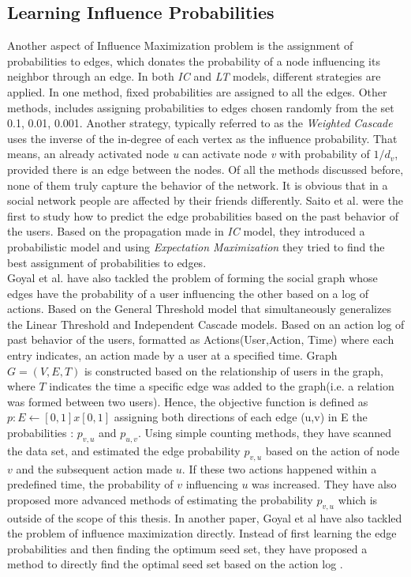 \documentclass[english]{tktltiki}
\begin{document}
\subsection{Learning Influence Probabilities}
\label{subsec:learninginfprob}
Another aspect of Influence Maximization problem is the assignment of probabilities to edges, which donates the probability of a node influencing its neighbor through an edge. In both \textit{IC} and \textit{LT} models, different strategies are applied. In one method, fixed probabilities are assigned to all the edges. Other methods, includes assigning probabilities to edges chosen randomly from the set {0.1, 0.01, 0.001}. Another strategy, typically referred to as the \textit{Weighted Cascade} uses the inverse of the in-degree of each vertex as the influence probability. That means, an already activated node \textit{u} can activate node \textit{v} with probability of $1/d_v$, provided there is an edge between the nodes. Of all the methods discussed before, none of them truly capture the behavior of the network. It is obvious that in a social network people are affected by their friends differently. Saito et al. \cite{saito08} were the first to study how to predict the edge probabilities based on the past behavior of the users. Based on the propagation made in \textit{IC} model, they introduced a probabilistic model and using \textit{Expectation Maximization} they tried to find the best assignment of probabilities to edges. \\
Goyal et al. \cite{goyal10} have also tackled the problem of forming the social graph whose edges have the probability of a user
influencing the other based on a log of actions. Based on the General Threshold model that simultaneously 
generalizes the Linear Threshold and Independent Cascade models. Based on an action log of past behavior of the users, formatted as Actions(User,Action, Time) where each entry indicates, an action made by a user at a specified time. 
Graph $G = (V,E,T)$ is constructed based on the relationship of users in the graph, where $T$ indicates the time a specific edge was added to the graph(i.e. a relation was formed between two users). Hence, the objective function is defined as $p : E \leftarrow [0,1] x [0,1]$ assigning both directions of each edge (u,v) in E the probabilities : $p_{v,u}$ and $p_{u,v}$.
Using simple counting methods, they have scanned the data set, and estimated the edge probability $p_{v,u}$ based on the action of node $v$ and the subsequent action made $u$. If these two actions happened within a predefined time, the probability of $v$ influencing $u$ was increased. They have also proposed more advanced methods of estimating the probability $p_{v,u}$ which is outside of the scope of this thesis.
In another paper, Goyal et al \cite{goyal11} have also tackled the problem of influence maximization directly. Instead of first learning the edge probabilities and then finding the optimum seed set, they have proposed a method to directly find the optimal seed set based on the action log .
\end{document}
